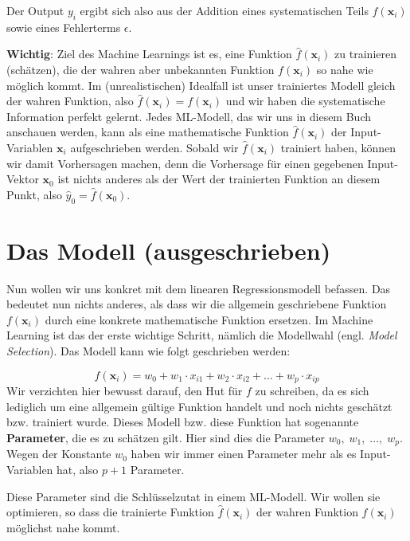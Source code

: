 \documentclass[
]{book}
\begin{document}
Der Output \(y_i\) ergibt sich also aus der Addition eines systematischen Teils \(f(\mathbf{x}_i)\) sowie eines Fehlerterms \(\epsilon\).

\textbf{Wichtig}: Ziel des Machine Learnings ist es, eine Funktion \(\hat{f}(\mathbf{x}_i)\) zu trainieren (schätzen), die der wahren aber unbekannten Funktion \(f(\mathbf{x}_i)\) so nahe wie möglich kommt. Im (unrealistischen) Idealfall ist unser trainiertes Modell gleich der wahren Funktion, also \(\hat{f}(\mathbf{x}_i) = f(\mathbf{x}_i)\) und wir haben die systematische Information perfekt gelernt. Jedes ML-Modell, das wir uns in diesem Buch anschauen werden, kann als eine mathematische Funktion \(\hat{f}(\mathbf{x}_i)\) der Input-Variablen \(\mathbf{x}_i\) aufgeschrieben werden. Sobald wir \(\hat{f}(\mathbf{x}_i)\) trainiert haben, können wir damit Vorhersagen machen, denn die Vorhersage für einen gegebenen Input-Vektor \(\mathbf{x}_0\) ist nichts anderes als der Wert der trainierten Funktion an diesem Punkt, also \(\hat{y}_0 = \hat{f}(\mathbf{x}_0)\).

\hypertarget{das-modell-ausgeschrieben}{%
\section{Das Modell (ausgeschrieben)}\label{das-modell-ausgeschrieben}}

Nun wollen wir uns konkret mit dem linearen Regressionsmodell befassen. Das bedeutet nun nichts anderes, als dass wir die allgemein geschriebene Funktion \(f(\mathbf{x}_i)\) durch eine konkrete mathematische Funktion ersetzen. Im Machine Learning ist das der erste wichtige Schritt, nämlich die Modellwahl (engl. \emph{Model Selection}). Das Modell kann wie folgt geschrieben werden:

\[
f(\mathbf{x}_i) = w_0 + w_1 \cdot x_{i1} + w_2 \cdot x_{i2} + \ldots + w_p \cdot x_{ip}
\]
Wir verzichten hier bewusst darauf, den Hut für \(f\) zu schreiben, da es sich lediglich um eine allgemein gültige Funktion handelt und noch nichts geschätzt bzw. trainiert wurde. Dieses Modell bzw. diese Funktion hat sogenannte \textbf{Parameter}, die es zu schätzen gilt. Hier sind dies die Parameter \(w_0,\; w_1,\; \ldots,\; w_p\). Wegen der Konstante \(w_0\) haben wir immer einen Parameter mehr als es Input-Variablen hat, also \(p+1\) Parameter.

Diese Parameter sind die Schlüsselzutat in einem ML-Modell. Wir wollen sie optimieren, so dass die trainierte Funktion \(\hat{f}(\mathbf{x}_i)\) der wahren Funktion \(f(\mathbf{x}_i)\) möglichst nahe kommt.
\end{document}
